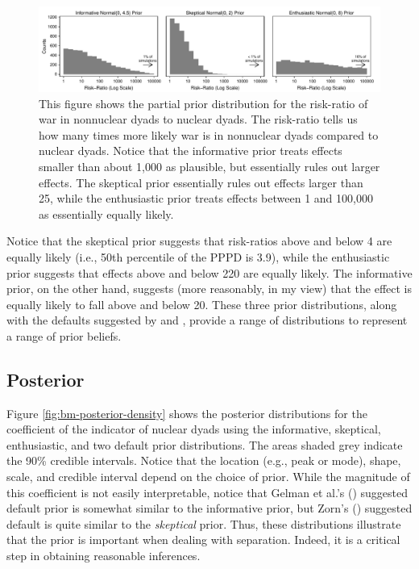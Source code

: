 \documentclass[12pt]{article}
\begin{document}
\begin{figure}[H]
\begin{center}
\includegraphics[scale = .8]{figs/bm-pppd-hist.pdf}
\caption{This figure shows the partial prior distribution for the risk-ratio of war in nonnuclear dyads to nuclear dyads. 
The risk-ratio tells us how many times more likely war is in nonnuclear dyads compared to nuclear dyads. 
Notice that the informative prior treats effects smaller than about 1,000 as plausible, but essentially rules out larger effects. 
The skeptical prior essentially rules out effects larger than 25, while the enthusiastic prior treats effects between 1 and 100,000 as essentially equally likely.}\label{fig:bm-pppd-hist}
\end{center}
\end{figure}



Notice that the skeptical prior suggests that risk-ratios above and below 4 are equally likely (i.e., 50th percentile of the PPPD is 3.9), while the enthusiastic prior suggests that effects above and below 220 are equally likely. 
The informative prior, on the other hand, suggests (more reasonably, in my view) that the effect is equally likely to fall above and below 20. 
These three prior distributions, along with the defaults suggested by \cite{Zorn2005} and \cite{Gelmanetal2008}, provide a range of distributions to represent a range of prior beliefs.

\subsection*{Posterior}

Figure \ref{fig:bm-posterior-density} shows the posterior distributions for the coefficient of the indicator of nuclear dyads using the informative, skeptical, enthusiastic, and two default prior distributions. 
The areas shaded grey indicate the 90\% credible intervals. Notice that the location (e.g., peak or mode), shape, scale, and credible interval depend on the choice of prior. 
While the magnitude of this coefficient is not easily interpretable, notice that Gelman et al.'s (\citeyear{Gelmanetal2008}) suggested default prior is somewhat similar to the informative prior, but Zorn's (\citeyear{Zorn2005}) suggested default is quite similar to the \emph{skeptical} prior. 
Thus, these distributions illustrate that the prior is important when dealing with separation. 
Indeed, it is a critical step in obtaining reasonable inferences.
\end{document}
